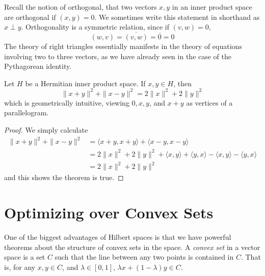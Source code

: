 Recall the notion of orthogonal, that two vectors $x,y$ in an inner product space are orthogonal if $(x,y) = 0$. We sometimes write this statement in shorthand as $x \perp y$. Orthogonality is a symmetric relation, since if $(v,w) = 0$,
%
\[ (w,v) = \overline{(v,w)} = \overline{0} = 0 \]
%
The theory of right triangles essentially manifests in the theory of equations involving two to three vectors, as we have already seen in the case of the Pythagorean identity.

\begin{theorem}
    Let $H$ be a Hermitian inner product space. If $x,y \in H$, then
    \[ \| x + y \|^2 + \| x - y \|^2 = 2 \| x \|^2 + 2 \| y \|^2 \]
    which is geometrically intuitive, viewing $0, x, y$, and $x + y$ as vertices of a parallelogram.
\end{theorem}
\begin{proof}
    We simply calculate
    \begin{align*}
        \| x + y \|^2 + \| x - y \|^2 &= \langle x + y, x + y \rangle + \langle x - y, x - y \rangle\\
        &= 2 \| x \|^2 + 2 \| y \|^2 + \langle x, y \rangle + \langle y, x \rangle - \langle x, y \rangle - \langle y, x \rangle\\
        &= 2 \| x \|^2 + 2 \| y \|^2
    \end{align*}
    and this shows the theorem is true.
\end{proof}

\section{Optimizing over Convex Sets}

One of the biggest advantages of Hilbert spaces is that we have powerful theorems about the structure of convex sets in the space. A \emph{convex set} in a vector space is a set $C$ such that the line between any two points is contained in $C$. That is, for any $x, y \in C$, and $\lambda \in [0,1]$, $\lambda x + (1 - \lambda) y \in C$.

